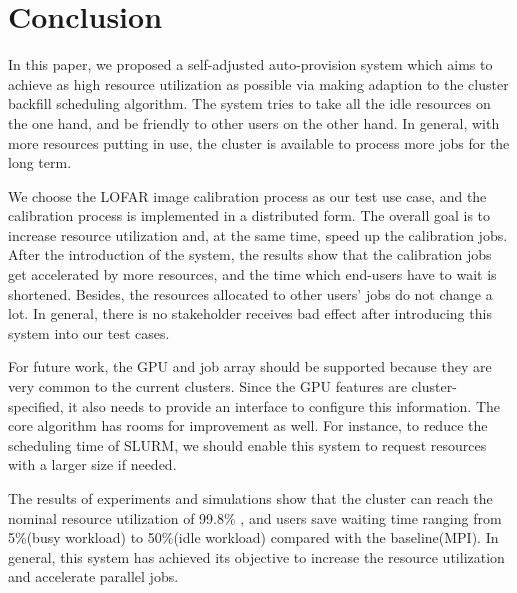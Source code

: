 
\chapter{Conclusion} %





% 



In this paper, we proposed a self-adjusted auto-provision system which aims to achieve as high resource utilization as possible via making adaption to the cluster backfill scheduling algorithm. 
The system tries to take all the idle resources on the one hand, and be friendly to other users on the other hand. 
In general, with more resources putting in use, the cluster is available to process more jobs for the long term.

We choose the LOFAR image calibration process as our test use case, and the calibration process is implemented in a distributed form. 
The overall goal is to increase resource utilization and, at the same time, speed up the calibration jobs. 
After the introduction of the system, the results show that the calibration jobs get accelerated by more resources, and the time which end-users have to wait is shortened. 
Besides, the resources allocated to other users’ jobs do not change a lot. 
In general, there is no stakeholder receives bad effect after introducing this system into our test cases.

For future work, the GPU and job array should be supported because they are very common to the current clusters. 
Since the GPU features are cluster- specified, it also needs to provide an interface to configure this information. 
The core algorithm has rooms for improvement as well. 
For instance, to reduce the scheduling time of SLURM, we should enable this system to request resources with a larger size if needed.

The results of experiments and simulations show that the cluster can reach the nominal resource utilization of 99.8\% , and users save waiting time ranging from  5\%(busy workload) to 50\%(idle workload) compared with the baseline(MPI). 
In general, this system has achieved its objective to increase the resource utilization and accelerate parallel jobs.

